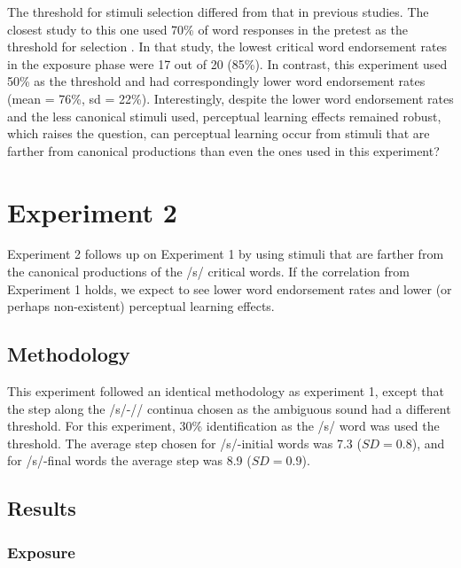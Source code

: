 The threshold for stimuli selection differed from that in previous studies. The closest study to this one used 70\% of word responses in the pretest as the threshold for selection \citep{Reinisch2013}.  In that study, the lowest critical word endorsement rates in the exposure phase were 17 out of 20 (85\%).  In contrast, this experiment used 50\% as the threshold and had correspondingly lower word endorsement rates (mean = 76\%, sd = 22\%).  Interestingly, despite the lower word endorsement rates and the less canonical stimuli used, perceptual learning effects remained robust, which raises the question, can perceptual learning occur from stimuli that are farther from canonical productions than even the ones used in this experiment?

\section{Experiment 2}

Experiment 2 follows up on Experiment 1 by using stimuli that are farther from the canonical productions of the /s/ critical words.  If the correlation from Experiment 1 holds, we expect to see lower word endorsement rates and lower (or perhaps non-existent) perceptual learning effects.

\subsection{Methodology}

This experiment followed an identical methodology as experiment 1, except that the step along the /s/-/\textesh/ continua chosen as the ambiguous sound had a different threshold.  For this experiment, 30\% identification as the /s/ word was used the threshold. The average step chosen for /s/-initial words was 7.3 ($SD = 0.8$), and for /s/-final words the average step was 8.9 ($SD = 0.9$).

\subsection{Results}

\subsubsection{Exposure}

